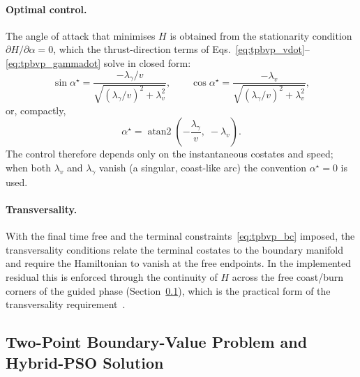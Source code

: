 \paragraph{Optimal control.}
The angle of attack that minimises $H$ is obtained from the stationarity
condition $\partial H/\partial\alpha = 0$, which the thrust-direction terms of
Eqs.~\eqref{eq:tpbvp_vdot}--\eqref{eq:tpbvp_gammadot} solve in closed form:
\begin{equation}
  \sin\alpha^\star = \frac{-\lambda_\gamma/v}{\sqrt{(\lambda_\gamma/v)^2 + \lambda_v^2}},
  \qquad
  \cos\alpha^\star = \frac{-\lambda_v}{\sqrt{(\lambda_\gamma/v)^2 + \lambda_v^2}},
  \label{eq:tpbvp_control_sc}
\end{equation}
or, compactly,
\begin{equation}
  \alpha^\star = \operatorname{atan2}\!\left(-\frac{\lambda_\gamma}{v},\; -\lambda_v\right).
  \label{eq:tpbvp_control}
\end{equation}
The control therefore depends only on the instantaneous costates and speed; when
both $\lambda_v$ and $\lambda_\gamma$ vanish (a singular, coast-like arc) the
convention $\alpha^\star = 0$ is used.

\paragraph{Transversality.}
With the final time free and the terminal constraints~\eqref{eq:tpbvp_bc}
imposed, the transversality conditions relate the terminal costates to the
boundary manifold and require the Hamiltonian to vanish at the free endpoints.
In the implemented residual this is enforced through the continuity of $H$ across
the free coast/burn corners of the guided phase (Section~\ref{ssec:tpbvp_pso}),
which is the practical form of the transversality
requirement~\cite{BrysonHo,Hull,Longuski}.

\subsection{Two-Point Boundary-Value Problem and Hybrid-PSO Solution}
\label{ssec:tpbvp_pso}

